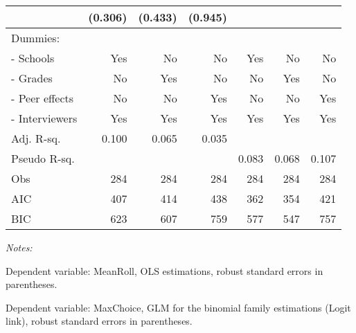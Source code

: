 \begin{table}[htbp]
\begin{adjustbox}{width=1\textwidth}
\begin{threeparttable}
\begin{tabular}{l*{6}{D{.}{.}{-1}}}
                    &             (0.306)   &             (0.433)   &             (0.945)   &                       &                       &                       \\ \midrule
Dummies: &&&&& \\                    
- Schools             &                 Yes   &                  No   &                  No   &                 Yes   &                  No   &                  No   \\
- Grades              &                  No   &                 Yes   &                  No   &                  No   &                 Yes   &                  No   \\
- Peer effects        &                  No   &                  No   &                 Yes   &                  No   &                  No   &                 Yes   \\
- Interviewers        &                 Yes   &                 Yes   &                 Yes   &                 Yes   &                 Yes   &                 Yes   \\
\midrule
Adj. R-sq.          &               0.100   &               0.065   &               0.035   &     	          &   	                &                 \\
Pseudo R-sq.        &                       &                       &       &     0.083	          &   0.068	                &           0.107 \\
Obs                 &                 284   &                 284   &                 284   &                 284   &                 284   &                 284   \\
AIC                 &                 407   &                 414   &                 438   &                 362   &                 354   &                 421   \\
BIC                 &                 623   &                 607   &                 759   &                 577   &                 547   &                 757   \\
\bottomrule
\end{tabular}
\begin{tablenotes}
\footnotesize
\item \textit{Notes:} \\
\item[1] Dependent variable: MeanRoll, OLS estimations, robust standard errors in parentheses. \\ 
\item[2] Dependent variable: MaxChoice, GLM for the binomial family estimations (Logit link), robust standard errors in parentheses. \\

\end{tablenotes}
\end{threeparttable}
\end{adjustbox}
\end{table}
